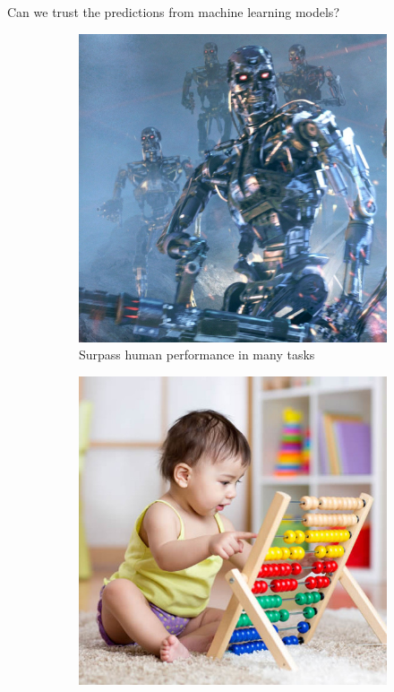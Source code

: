 \documentclass[9pt]{beamer}
\begin{document}
\begin{frame}{Can we trust the predictions from machine learning models?}
\begin{figure}
    \centering
    \small
    \begin{subfigure}[t]{0.30\linewidth}
        \centering
        \captionsetup{justification=centering}
        \includegraphics[width=\linewidth]{images/skynet.jpg}
        \caption{Surpass human performance in many tasks}
    \end{subfigure}
    \hspace{2em}
    \begin{subfigure}[t]{0.30\linewidth}
        \centering
        \captionsetup{justification=centering}
        \includegraphics[width=\linewidth]{images/baby.jpg}

\end{subfigure}
\end{figure}
\end{frame}
\end{document}
